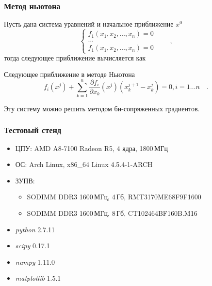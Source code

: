 \documentclass[t]{beamer}
\begin{document}
\begin{frame}
    \frametitle{Метод ньютона}
    Пусть дана система уравнений и начальное приближение $x^0$
    \begin{equation*}\label{eq:newton-needed-form}
        \begin{cases}
            f_1(x_1, x_2,\dots, x_n) = 0\\
            \dots\\
            f_1(x_1, x_2,\dots, x_n) = 0
        \end{cases} \qquad ,
    \end{equation*}
    \pause
    тогда следующее приближение вычисляется как
    \begin{block}{Следующее приближение в методе Ньютона}
        \begin{equation*}\label{eq:newton-generalized-iteration}
            f_i(x^j) + \sum_{k=1}^n \frac{\partial f_i}{\partial x_k}(x^j)
            (x_k^{j+1}-x_k^{j}) = 0,  i=1\dots n \quad .
        \end{equation*}
    \end{block}
    Эту систему можно решить методом би-сопряженных градиентов.
\end{frame}


\begin{frame}
    \frametitle{Тестовый стенд}
    \begin{itemize}
        \item ЦПУ: AMD A8-7100 Radeon R5, 4 ядра, 1800\,МГц
        \item ОС: Arch Linux, x86\_64 Linux 4.5.4-1-ARCH
        \item ЗУПВ:
            \begin{itemize}
                \item SODIMM DDR3 1600\,МГц, 4\,Гб, RMT3170ME68F9F1600
                \item SODIMM DDR3 1600\,МГц, 8\,Гб, CT102464BF160B.M16
            \end{itemize}
        \item \emph{python} 2.7.11
        \item \emph{scipy} 0.17.1
        \item \emph{numpy} 1.11.0
        \item \emph{matplotlib} 1.5.1
    \end{itemize}
\end{frame}
\end{document}
